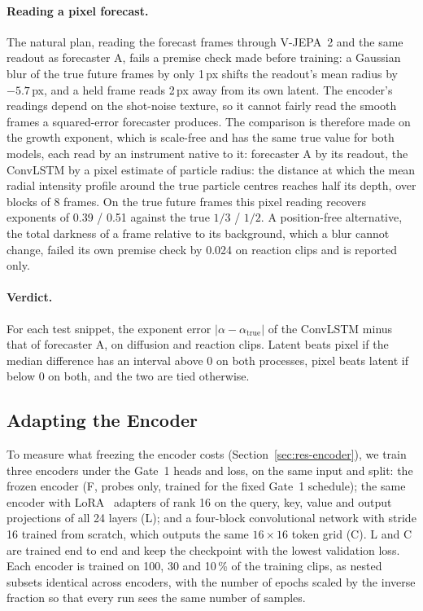 \paragraph{Reading a pixel forecast.} The natural plan, reading the forecast frames
through V-JEPA~2 and the same readout as forecaster A, fails a premise check made before
training: a Gaussian blur of the true future frames by only 1\,px shifts the readout's
mean radius by $-5.7$\,px, and a held frame reads 2\,px away from its own latent. The
encoder's readings depend on the shot-noise texture, so it cannot fairly read the smooth
frames a squared-error forecaster produces. The comparison is therefore made on the
growth exponent, which is scale-free and has the same true value for both models, each
read by an instrument native to it: forecaster A by its readout, the ConvLSTM by a pixel
estimate of particle radius: the distance at which the mean radial intensity profile
around the true particle centres reaches half its depth, over blocks of 8 frames. On the true future frames this pixel reading recovers exponents of 0.39 / 0.51
against the true $1/3$ / $1/2$. A position-free alternative, the total darkness of a
frame relative to its background, which a blur cannot change, failed its own premise
check by 0.024 on reaction clips and is reported only.

\paragraph{Verdict.} For each test snippet, the exponent error $|\alpha - \alpha_{\text{true}}|$
of the ConvLSTM minus that of forecaster A, on diffusion and reaction clips. Latent beats
pixel if the median difference has an interval above 0 on both processes, pixel beats
latent if below 0 on both, and the two are tied otherwise.

\subsection{Adapting the Encoder}
\label{sec:method-encoder}

To measure what freezing the encoder costs (Section~\ref{sec:res-encoder}), we train
three encoders under the Gate~1 heads and loss, on the same input and split: the frozen
encoder (\textsf{F}, probes only, trained for the fixed Gate~1 schedule); the same encoder
with LoRA~\cite{hu2022lora} adapters of rank 16 on the query, key, value and output
projections of all 24 layers (\textsf{L}); and a four-block convolutional network with
stride 16 trained from scratch, which outputs the same $16 \times 16$ token grid
(\textsf{C}). \textsf{L} and \textsf{C} are trained end to end and keep the checkpoint
with the lowest validation loss. Each encoder is trained on 100, 30 and 10\,\% of the
training clips, as nested subsets identical across encoders, with the number of epochs
scaled by the inverse fraction so that every run sees the same number of samples.

